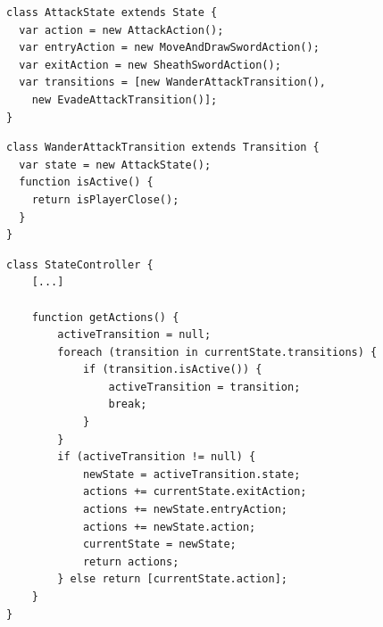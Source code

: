 \begin{minipage}{\linewidth}
\begin{lstlisting}[linewidth=16.4cm, label=lst:fsm_example-state, caption=Beispiel-State, xleftmargin=1cm]
class AttackState extends State {
  var action = new AttackAction();
  var entryAction = new MoveAndDrawSwordAction();
  var exitAction = new SheathSwordAction();
  var transitions = [new WanderAttackTransition(),
    new EvadeAttackTransition()];
}
\end{lstlisting}
\end{minipage}

\begin{minipage}{\linewidth}
\begin{lstlisting}[linewidth=16.4cm, label=lst:fsm_example-transition, caption=Beispiel-Transition, xleftmargin=1cm]
class WanderAttackTransition extends Transition {
  var state = new AttackState();
  function isActive() {
    return isPlayerClose();
  }
}
\end{lstlisting}
\end{minipage}

\begin{minipage}{\linewidth}
\hspace{2cm} \begin{lstlisting}[linewidth=16.4cm, label=lst:fsm_getactions, caption=State Machine Controller, xleftmargin=1cm]
class StateController {
    [...]

    function getActions() {
        activeTransition = null;
        foreach (transition in currentState.transitions) {
            if (transition.isActive()) {
                activeTransition = transition;
                break;
            }
        }
        if (activeTransition != null) {
            newState = activeTransition.state;
            actions += currentState.exitAction;
            actions += newState.entryAction;
            actions += newState.action;
            currentState = newState;
            return actions;
        } else return [currentState.action];
    }
}
\end{lstlisting}
\end{minipage}

